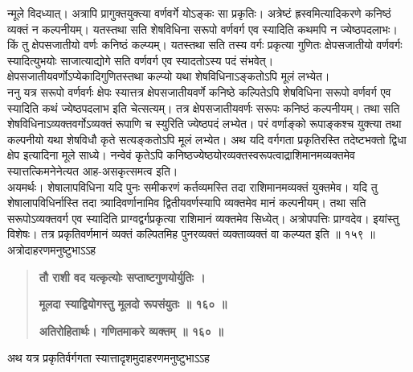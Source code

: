 \documentclass[11pt, openany]{book}
\begin{document}
\begin{sloppypar}
\hangindent=0.2in न्मूले विदध्यात्। अत्रापि प्रागुक्तयुक्त्या वर्णवर्गे योऽङ्कः सा प्रकृतिः। अत्रेष्टं ह्रस्वमित्यादिकरणे कनिष्ठं व्यक्तं न कल्पनीयम्। यतस्तथा सति शेषविधिना सरूपो वर्णवर्ग एव स्यादिति कथमपि न ज्येष्ठपदलाभः। किं तु क्षेपसजातीयो वर्णः कनिष्ठं कल्प्यम्। यतस्तथा सति तस्य वर्गः प्रकृत्या गुणितः क्षेपसजातीयो वर्णवर्गः स्यादित्युभयोः साजात्याद्योगे सति वर्णवर्ग एव स्यादतोऽस्य पदं संभवेत्। क्षेपसजातीयवर्णोऽप्येकादिगुणितस्तथा कल्प्यो यथा शेषविधिनाऽङ्कतोऽपि मूलं लभ्येत।\\

\hangindent=0.2in \hspace{0.2in}ननु यत्र सरूपो वर्णवर्गः क्षेपः स्यात्तत्र क्षेपसजातीयवर्णे कनिष्ठे कल्पितेऽपि शेषविधिना सरूपो वर्णवर्ग एव स्यादिति कथं ज्येष्ठपदलाभ इति चेत्सत्यम्। तत्र क्षेपसजातीयवर्णः सरूपः कनिष्ठं कल्पनीयम्। तथा सति शेषविधिनाऽव्यक्तवर्गोऽव्यक्तं रूपाणि च स्युरिति ज्येष्ठपदं लभ्येत। परं वर्णाङ्को रूपाङ्कश्च युक्त्या तथा कल्पनीयो यथा शेषविधौ कृते सत्यङ्कतोऽपि मूलं लभ्येत। अथ यदि वर्गगता प्रकृतिरस्ति तदेष्टभक्तो द्विधा क्षेप इत्यादिना मूले साध्ये। नन्वेवं कृतेऽपि कनिष्ठज्येष्ठयोरव्यक्तस्वरूपत्वाद्राशिमानमव्यक्तमेव स्यात्तत्किमनेनेत्यत आह-असकृत्समत्व इति।\\

\hangindent=0.2in \hspace{0.2in}अयमर्थः। शेषालापविधिना यदि पुनः समीकरणं कर्तव्यमस्ति तदा राशिमानमव्यक्तं युक्तमेव। यदि तु शेषालापविधिर्नास्ति तदा त्र्यादिवर्णानामिव द्वितीयवर्णस्यापि व्यक्तमेव मानं कल्पनीयम्। तथा सति सरूपोऽव्यक्तवर्ग एव स्यादिति प्राग्वद्वर्गप्रकृत्या राशिमानं व्यक्तमेव सिध्येत्। अत्रोपपत्तिः प्राग्वदेव। इयांस्तु विशेषः। तत्र प्रकृतिवर्णमानं व्यक्तं कल्पितमिह पुनरव्यक्तं व्यक्ताव्यक्तं वा कल्प्यत इति ॥ १५९ ॥\\

\hangindent=0.2in \hspace{0.2in}अत्रोदाहरणमनुष्टुभाऽऽह\textendash

\begin{quote}
\hspace{1in}\textbf{तौ राशी वद यत्कृत्योः सप्ताष्टगुणयोर्युतिः ।}

\hspace{1in}\textbf{मूलदा स्याद्वियोगस्तु मूलदो रूपसंयुतः ॥ १६० ॥}

\hspace{1in}\textbf{अतिरोहितार्थः। गणितमाकरे व्यक्तम् ॥ १६० ॥}
\end{quote}

\hangindent=0.2in \hspace{0.2in}अथ यत्र प्रकृतिर्वर्गगता स्यात्तादृशमुदाहरणमनुष्टुभाऽऽह\textendash


\end{sloppypar}
\end{document}
